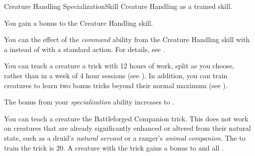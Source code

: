     \begin{feat}{Creature Handling Specialization}{Skill}
        \featpre Creature Handling as a trained skill.

         You gain a  bonus to the Creature Handling skill.

         You can  the effect of the \textit{command} ability from the Creature Handling skill with a  instead of with a standard action.
        For details, see .

         You can teach a creature a trick with 12 hours of work, split as you choose, rather than in a week of 4 hour sessions (see ).
        In addition, you can train creatures to learn two bonus tricks beyond their normal maximum (see ).

         The bonus from your \textit{specialization} ability increases to .

         You can teach a creature the Battleforged Companion trick.
        This does not work on creatures that are already significantly enhanced or altered from their natural state, such as a druid's \textit{natural servant} or a ranger's \textit{animal companion}.
        The  to train the trick is 20.
        A creature with the trick gains a  bonus to  and all .
    \end{feat}

